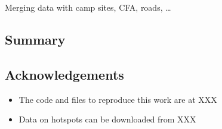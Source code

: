 Merging data with camp sites, CFA, roads, \ldots{}

\hypertarget{summary}{%
\subsection{Summary}\label{summary}}

\hypertarget{acknowledgements}{%
\subsection{Acknowledgements}\label{acknowledgements}}

\begin{itemize}
\tightlist
\item
  The code and files to reproduce this work are at XXX
\item
  Data on hotspots can be downloaded from XXX
\end{itemize}




\address{%
Weihao Li\\
Monash University\\%
line 1\\ line 2\\
%
%
%
\\\href{mailto:wlii0039@student.monash.edu}{\nolinkurl{wlii0039@student.monash.edu}}
}

\address{%
Emily Dodwell\\
AT\&T\\%
line 1\\ line 2\\
%
%
%
\\\href{mailto:emily@research.att.com}{\nolinkurl{emily@research.att.com}}
}

\address{%
Dianne Cook\\
Monash University\\%
line 1\\ line 2\\
%
%
%
\\\href{mailto:dicook@monash.edu}{\nolinkurl{dicook@monash.edu}}
}

